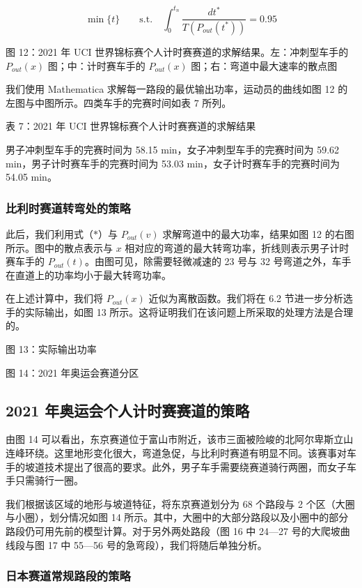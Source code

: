 \documentclass[11pt,a4paper]{ctexart}
\begin{document}
\[
\min\{t\}\qquad\mathrm{s.t.}\quad\int_0^{t_n}\frac{dt^{\ast}}{T\left(P_{out}(t^{\ast})\right)}=0.95
\]

图 12：2021 年 UCI 世界锦标赛个人计时赛赛道的求解结果。左：冲刺型车手的 $P_{out}(x)$ 图；中：计时赛车手的 $P_{out}(x)$ 图；右：弯道中最大速率的散点图

我们使用 Mathematica 求解每一路段的最优输出功率，运动员的曲线如图 12 的左图与中图所示。四类车手的完赛时间如表 7 所列。

表 7：2021 年 UCI 世界锦标赛个人计时赛赛道的求解结果

男子冲刺型车手的完赛时间为 58.15 min，女子冲刺型车手的完赛时间为 59.62 min，男子计时赛车手的完赛时间为 53.03 min，女子计时赛车手的完赛时间为 54.05 min。

\subsubsection{比利时赛道转弯处的策略}

此后，我们利用式（$\ast$）与 $P_{out}(v)$ 求解弯道中的最大功率，结果如图 12 的右图所示。图中的散点表示与 $x$ 相对应的弯道的最大转弯功率，折线则表示男子计时赛车手的 $P_{out}(t)$。由图可见，除需要轻微减速的 23 号与 32 号弯道之外，车手在直道上的功率均小于最大转弯功率。

在上述计算中，我们将 $P_{out}(x)$ 近似为离散函数。我们将在 6.2 节进一步分析选手的实际输出，如图 13 所示。这将证明我们在该问题上所采取的处理方法是合理的。

图 13：实际输出功率

图 14：2021 年奥运会赛道分区

\subsection{2021 年奥运会个人计时赛赛道的策略}

由图 14 可以看出，东京赛道位于富山市附近，该市三面被险峻的北阿尔卑斯立山连峰环绕。这里地形变化很大，弯道急促，与比利时赛道有明显不同。该赛事对车手的坡道技术提出了很高的要求。此外，男子车手需要绕赛道骑行两圈，而女子车手只需骑行一圈。

我们根据该区域的地形与坡道特征，将东京赛道划分为 68 个路段与 2 个区（大圈与小圈），划分情况如图 14 所示。其中，大圈中的大部分路段以及小圈中的部分路段仍可用先前的模型计算。对于另外两处路段（图 16 中 24—27 号的大爬坡曲线段与图 17 中 55—56 号的急弯段），我们将随后单独分析。

\subsubsection{日本赛道常规路段的策略}
\end{document}
